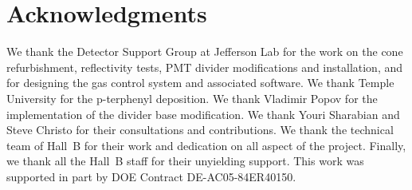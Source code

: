 \section{Acknowledgments}

We thank the Detector Support Group at Jefferson Lab for the work on the cone refurbishment, reflectivity tests,
PMT divider modifications and installation, and for designing the gas control system and associated software. We
thank Temple University for the p-terphenyl deposition. We thank Vladimir Popov for the implementation of the
divider base modification. We thank Youri Sharabian and Steve Christo for their consultations and contributions.
We thank the technical team of Hall~B for their work and dedication on all aspect of the project. Finally, we thank
all the Hall~B staff for their unyielding support. This work was supported in part by
DOE Contract DE-AC05-84ER40150.
